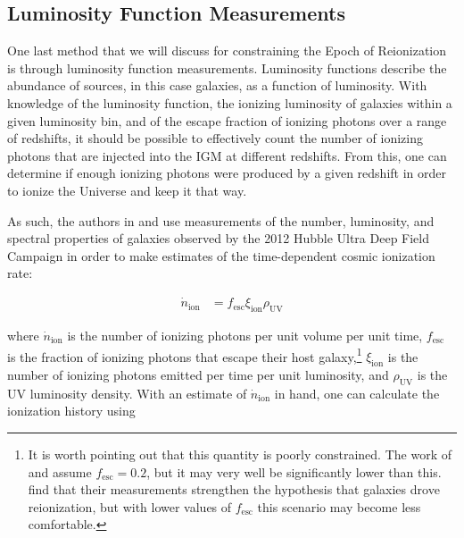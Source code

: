% 


\subsection{Luminosity Function Measurements}

One last method that we will discuss for constraining the Epoch of Reionization is through luminosity function measurements. Luminosity functions describe the abundance of sources, in this case galaxies, as a function of luminosity. With knowledge of the luminosity function, the ionizing luminosity of galaxies within a given luminosity bin, and of the escape fraction of ionizing photons over a range of redshifts, it should be possible to effectively count the number of ionizing photons that are injected into the IGM at different redshifts. From this, one can determine if enough ionizing photons were produced by a given redshift in order to ionize the Universe and keep it that way. 


As such, the authors in \citet{Robertson2013} and \citet{robertson2015cosmic} use measurements of the number, luminosity, and spectral properties of galaxies observed by the 2012 Hubble Ultra Deep Field Campaign in order to make estimates of the time-dependent cosmic ionization rate:

\begin{align}
\dot{n}_{\text{ion}} &= f_{\text{esc}} \xi_{\text{ion}} \rho_{\text{UV}}
\end{align}

where $\dot{n}_{\text{ion}}$ is the number of ionizing photons per unit volume per unit time, $f_{\text{esc}}$ is the fraction of ionizing photons that escape their host galaxy,\footnote{It is worth pointing out that this quantity is poorly constrained. The work of \citet{Robertson2013} and \citet{robertson2015cosmic} assume $f_{\text{esc}} = 0.2$, but it may very well be significantly lower than this. \citet{robertson2015cosmic} find that their measurements strengthen the hypothesis that galaxies drove reionization, but with lower values of $f_{\text{esc}}$ this scenario may become less comfortable.} $\xi_{\text{ion}}$ is the number of ionizing photons emitted per time per unit luminosity, and $\rho_{\text{UV}}$ is the UV luminosity density. With an estimate of $\dot{n}_{\text{ion}}$ in hand, one can calculate the ionization history using

